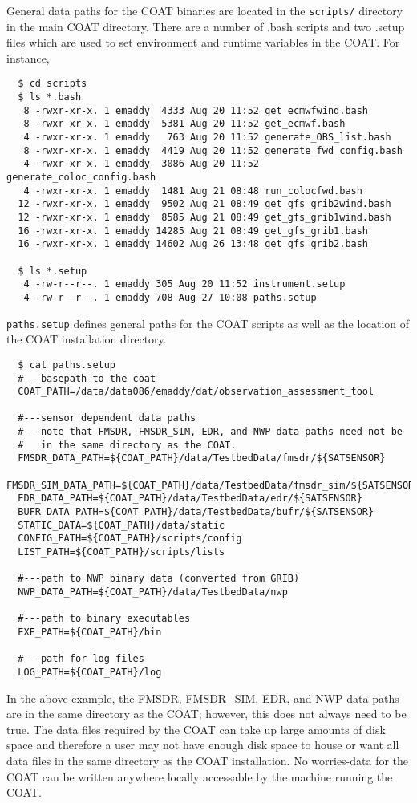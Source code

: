 \documentclass[10pt]{report}
\begin{document}
General data paths for the COAT binaries are located in the {\tt scripts/} directory 
in the main COAT directory.  There are a number of .bash scripts and 
two .setup files which are used to set environment and runtime variables in the COAT.  For instance,
\begin{verbatim}
  $ cd scripts
  $ ls *.bash
   8 -rwxr-xr-x. 1 emaddy  4333 Aug 20 11:52 get_ecmwfwind.bash
   8 -rwxr-xr-x. 1 emaddy  5381 Aug 20 11:52 get_ecmwf.bash
   4 -rwxr-xr-x. 1 emaddy   763 Aug 20 11:52 generate_OBS_list.bash
   8 -rwxr-xr-x. 1 emaddy  4419 Aug 20 11:52 generate_fwd_config.bash
   4 -rwxr-xr-x. 1 emaddy  3086 Aug 20 11:52 generate_coloc_config.bash
   4 -rwxr-xr-x. 1 emaddy  1481 Aug 21 08:48 run_colocfwd.bash
  12 -rwxr-xr-x. 1 emaddy  9502 Aug 21 08:49 get_gfs_grib2wind.bash
  12 -rwxr-xr-x. 1 emaddy  8585 Aug 21 08:49 get_gfs_grib1wind.bash
  16 -rwxr-xr-x. 1 emaddy 14285 Aug 21 08:49 get_gfs_grib1.bash
  16 -rwxr-xr-x. 1 emaddy 14602 Aug 26 13:48 get_gfs_grib2.bash
  
  $ ls *.setup
   4 -rw-r--r--. 1 emaddy 305 Aug 20 11:52 instrument.setup
   4 -rw-r--r--. 1 emaddy 708 Aug 27 10:08 paths.setup
\end{verbatim}
{\tt paths.setup} defines general paths for the COAT scripts as well as the location of the COAT installation directory.  
\begin{verbatim}
  $ cat paths.setup
  #---basepath to the coat
  COAT_PATH=/data/data086/emaddy/dat/observation_assessment_tool

  #---sensor dependent data paths
  #---note that FMSDR, FMSDR_SIM, EDR, and NWP data paths need not be 
  #   in the same directory as the COAT.
  FMSDR_DATA_PATH=${COAT_PATH}/data/TestbedData/fmsdr/${SATSENSOR}
  FMSDR_SIM_DATA_PATH=${COAT_PATH}/data/TestbedData/fmsdr_sim/${SATSENSOR}
  EDR_DATA_PATH=${COAT_PATH}/data/TestbedData/edr/${SATSENSOR}
  BUFR_DATA_PATH=${COAT_PATH}/data/TestbedData/bufr/${SATSENSOR}
  STATIC_DATA=${COAT_PATH}/data/static
  CONFIG_PATH=${COAT_PATH}/scripts/config
  LIST_PATH=${COAT_PATH}/scripts/lists

  #---path to NWP binary data (converted from GRIB)
  NWP_DATA_PATH=${COAT_PATH}/data/TestbedData/nwp

  #---path to binary executables
  EXE_PATH=${COAT_PATH}/bin

  #---path for log files
  LOG_PATH=${COAT_PATH}/log
\end{verbatim}
In the above example, the FMSDR, FMSDR\_SIM, EDR, and NWP data paths are in the same directory as the COAT; 
however, this does not always need to be true.  The data files required by the COAT can take up large amounts 
of disk space and therefore a user may not have enough disk space to house or want all data files in the 
same directory as the COAT installation.  No worries-data for the COAT can be written 
anywhere locally accessable by the machine running the COAT.
\end{document}
